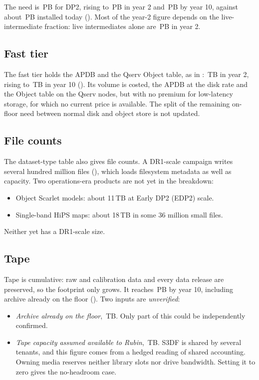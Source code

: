 The need is \smDPtwoOnFloorPB{}\,PB for DP2, rising to \smDRoneOnFloorPB{}\,PB
in year 2 and \smDRnineOnFloorPB{}\,PB by year 10, against about
\smInstalledPB{}\,PB installed today (). Most of the year-2
figure depends on the live-intermediate fraction: live intermediates alone are
\smDRoneLiveInterPB{}\,PB in year 2.

\subsection{Fast tier}

The fast tier holds the APDB and the Qserv Object table, as in
: \smFastDRoneTB{}\,TB in year 2, rising to \smFastDRnineTB{}\,TB in
year 10 (). Its volume is costed, the APDB at the disk rate and the
Object table on the Qserv nodes, but with no premium for low-latency storage,
for which no current price is available. The split of the remaining on-floor
need between normal disk and object store is not updated.

\subsection{File counts}

The dataset-type table also gives file counts. A DR1-scale campaign writes
several hundred million files (), which loads filesystem
metadata as well as capacity. Two operations-era products are not yet in the
breakdown:
\begin{itemize}
\item Object Scarlet models: about 11\,TB at Early DP2 (EDP2) scale.
\item Single-band HiPS maps: about 18\,TB in some 36 million small files.
\end{itemize}
Neither yet has a DR1-scale size.

\subsection{Tape}

Tape is cumulative: raw and calibration data and every data release are
preserved, so the footprint only grows. It reaches \smDRnineTapePB{}\,PB by year 10,
including archive already on the floor (). Two inputs are
\emph{unverified}:
\begin{itemize}
\item \emph{Archive already on the floor}, \smTapePreTB{}\,TB. Only part of
      this could be independently confirmed.
\item \emph{Tape capacity assumed available to Rubin}, \smTapeOwnedTB{}\,TB.
      S3DF is shared by several tenants, and this figure comes from a hedged
      reading of shared accounting. Owning media reserves neither library
      slots nor drive bandwidth. Setting it to zero gives the no-headroom
      case.
\end{itemize}

\begin{landscape}


\end{landscape}
